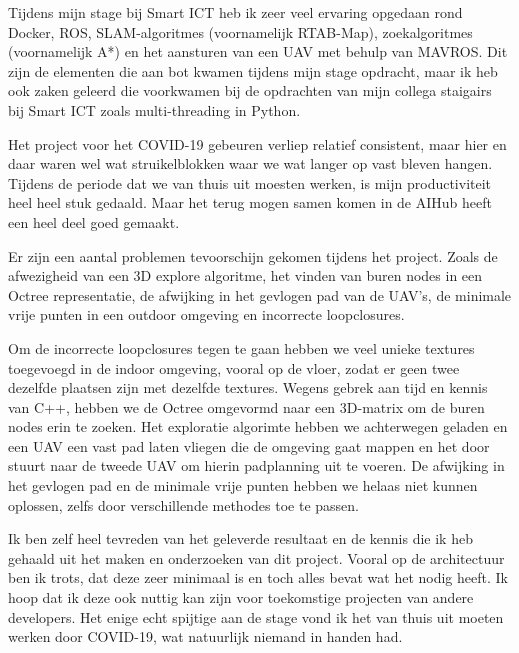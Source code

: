 Tijdens mijn stage bij Smart ICT heb ik zeer veel ervaring opgedaan rond Docker, ROS, SLAM-algoritmes (voornamelijk RTAB-Map), zoekalgoritmes (voornamelijk A*) en het aansturen van een UAV met behulp van MAVROS. Dit zijn de elementen die aan bot kwamen tijdens mijn stage opdracht, maar ik heb ook zaken geleerd die voorkwamen bij de opdrachten van mijn collega staigairs bij Smart ICT zoals multi-threading in Python.

Het project voor het COVID-19 gebeuren verliep relatief consistent, maar hier en daar waren wel wat struikelblokken waar we wat langer op vast bleven hangen. Tijdens de periode dat we van thuis uit moesten werken, is mijn productiviteit heel heel stuk gedaald. Maar het terug mogen samen komen in de AIHub heeft een heel deel goed gemaakt.

Er zijn een aantal problemen tevoorschijn gekomen tijdens het project. Zoals de afwezigheid van een 3D explore algoritme, het vinden van buren nodes in een Octree representatie, de afwijking in het gevlogen pad van de UAV's, de minimale vrije punten in een outdoor omgeving en incorrecte loopclosures.

Om de incorrecte loopclosures tegen te gaan hebben we veel unieke textures toegevoegd in de indoor omgeving, vooral op de vloer, zodat er geen twee dezelfde plaatsen zijn met dezelfde textures. Wegens gebrek aan tijd en kennis van C++, hebben we de Octree omgevormd naar een 3D-matrix om de buren nodes erin te zoeken. Het exploratie algorimte hebben we achterwegen geladen en een UAV een vast pad laten vliegen die de omgeving gaat mappen en het door stuurt naar de tweede UAV om hierin padplanning uit te voeren. De afwijking in het gevlogen pad en de minimale vrije punten hebben we helaas niet kunnen oplossen, zelfs door verschillende methodes toe te passen.

Ik ben zelf heel tevreden van het geleverde resultaat en de kennis die ik heb gehaald uit het maken en onderzoeken van dit project. Vooral op de architectuur ben ik trots, dat deze zeer minimaal is en toch alles bevat wat het nodig heeft. Ik hoop dat ik deze ook nuttig kan zijn voor toekomstige projecten van andere developers. Het enige echt spijtige aan de stage vond ik het van thuis uit moeten werken door COVID-19, wat natuurlijk niemand in handen had.